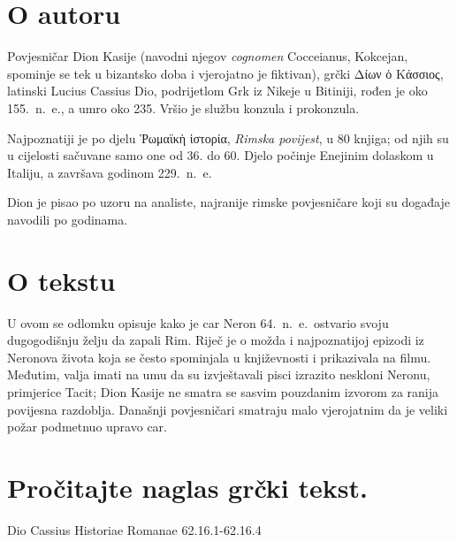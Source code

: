 \section*{O autoru}

Povjesničar Dion Kasije (navodni njegov \textit{cognomen} Cocceianus, Kokcejan, spominje se tek u bizantsko doba i vjerojatno je fiktivan), grčki \textgreek[variant=ancient]{Δίων ὁ Κάσσιος,} latinski Lucius Cassius Dio, podrijetlom Grk iz Nikeje u Bitiniji, rođen je oko 155.\ n.~e., a umro oko 235. Vršio je službu konzula i prokonzula.

Najpoznatiji je po djelu \textgreek[variant=ancient]{Ῥωμαϊκὴ ἱστορία}, \textit{Rimska povijest}, u 80 knjiga; od njih su u cijelosti sačuvane samo one od 36. do 60. Djelo počinje Enejinim dolaskom u Italiju, a završava godinom 229.\ n.~e. 

Dion je pisao po uzoru na analiste, najranije rimske povjesničare koji su događaje navodili po godinama.

\section*{O tekstu}

U ovom se odlomku opisuje kako je car Neron 64.\ n.~e.\ ostvario svoju dugogodišnju želju da zapali Rim. Riječ je o možda i najpoznatijoj epizodi iz Neronova života koja se često spominjala u književnosti i prikazivala na filmu. Međutim, valja imati na umu da su izvještavali pisci izrazito neskloni Neronu, primjerice Tacit; Dion Kasije ne smatra se sasvim pouzdanim izvorom za ranija povijesna razdoblja. Današnji povjesničari smatraju malo vjerojatnim da je veliki požar podmetnuo upravo car.

\newpage

\section*{Pročitajte naglas grčki tekst.}

Dio Cassius Historiae Romanae 62.16.1-62.16.4

\medskip


